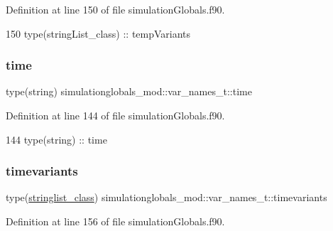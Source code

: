 Definition at line 150 of file simulation\+Globals.\+f90.


\begin{DoxyCode}
150         \textcolor{keywordtype}{type}(stringList\_class) :: tempVariants
\end{DoxyCode}
\mbox{\label{structsimulationglobals__mod_1_1var__names__t_a3826ddc89095f68c7ff6ee007adaaa45}} 
\subsubsection{\texorpdfstring{time}{time}}
{\footnotesize\ttfamily type(string) simulationglobals\+\_\+mod\+::var\+\_\+names\+\_\+t\+::time\hspace{0.3cm}{\ttfamily [private]}}



Definition at line 144 of file simulation\+Globals.\+f90.


\begin{DoxyCode}
144         \textcolor{keywordtype}{type}(string) :: time
\end{DoxyCode}
\mbox{\label{structsimulationglobals__mod_1_1var__names__t_a983950f023530bcc71b0a6d2d0037cbc}} 
\subsubsection{\texorpdfstring{timevariants}{timevariants}}
{\footnotesize\ttfamily type(\mbox{\hyperlink{structsimulationglobals__mod_1_1stringlist__class}{stringlist\+\_\+class}}) simulationglobals\+\_\+mod\+::var\+\_\+names\+\_\+t\+::timevariants\hspace{0.3cm}{\ttfamily [private]}}



Definition at line 156 of file simulation\+Globals.\+f90.


